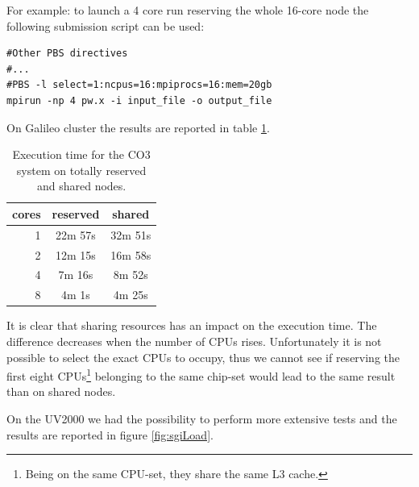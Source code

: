 \documentclass[a4paper,12pt]{article}
\newcommand\CO{CO3 }
\begin{document}
For example: to launch a 4 core run reserving the whole 16-core node the following submission script can be used:
\begin{verbatim}
#Other PBS directives
#...
#PBS -l select=1:ncpus=16:mpiprocs=16:mem=20gb
mpirun -np 4 pw.x -i input_file -o output_file 
\end{verbatim}

On Galileo cluster the results are reported in table \ref{tab:galileoNodeLoad}.

\begin{table}[hhh!]
\centering
\begin{tabular}{r|cc}
\textbf{cores} & \textbf{reserved} & \textbf{shared} \\ \hline \hline
1              & 22m 57s           & 32m 51s         \\ %
2              & 12m 15s           & 16m 58s         \\ %
4              & 7m 16s            & 8m 52s          \\ %
8              & 4m 1s             & 4m 25s             %
\end{tabular}
\caption{Execution time for the \CO system on totally reserved and shared nodes.}
\label{tab:galileoNodeLoad}
\end{table}

It is clear that sharing resources has an impact on the execution time. 
The difference decreases when the number of CPUs rises. 
Unfortunately it is not possible to select the exact CPUs to occupy, thus we cannot see if reserving the first eight CPUs\footnote{Being on the same CPU-set, they share the same L3 cache.} belonging to the same chip-set would lead to the same result than on shared nodes.

On the UV2000 we had the possibility to perform more extensive tests and the results are reported in figure \ref{fig:sgiLoad}.
\end{document}
